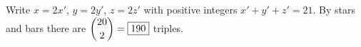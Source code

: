 Write $x=2x'$, $y=2y'$, $z=2z'$ with positive integers $x'+y'+z'=21$. By stars and bars there are $\dbinom{20}{2}=\boxed{190}$ triples.
